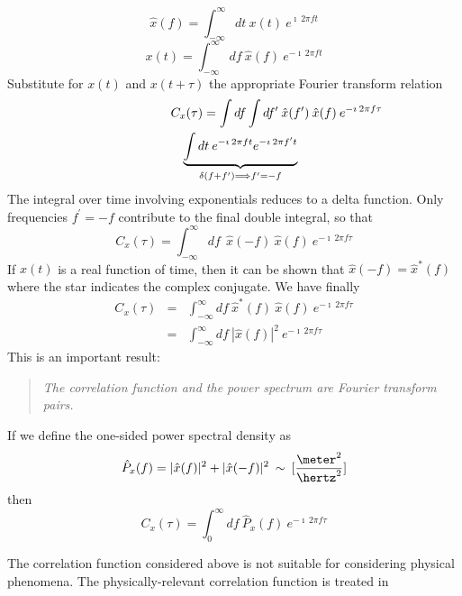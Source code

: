 \begin{equation}
\hat{x}(f) = \int_{-\infty}^{\infty} dt \: x(t) \: e^{\imath \: 2 \pi f t}
\end{equation}
\begin{equation}
x(t) = \int_{-\infty}^{\infty} df \: \hat{x}(f) \: e^{-\imath \: 2 \pi f t}
\end{equation}
Substitute for $x(t)$ and $x(t+\tau)$ the appropriate Fourier
transform relation
\begin{eqnarray*}
\lefteqn{C_x(\tau) = \int df  \int df^{\prime}  \: \hat{x}(f^{\prime}) \: \hat{x}(f) \: e^{-\imath \: 2 \pi f \tau}}\\
& & \underbrace{\int dt \: e^{-\imath \: 2 \pi f t}  e^{-\imath \: 2 \pi f^{\prime} t}}_{\delta(f+f^{\prime}) \Longrightarrow f^{\prime} = -f} 
\end{eqnarray*}
The integral over time involving exponentials reduces to a delta
function.  Only frequencies $f^{\prime} = -f$ contribute to the final
double integral, so that
\[
C_x(\tau) = \int_{-\infty}^{\infty} df \: \: \hat{x}(-f) \: \hat{x}(f) \: e^{-\imath \: 2 \pi f \tau}
\]
If $x(t)$ is a real function of time, then it can be shown that
$\hat{x}(-f) = \hat{x}^{*}(f)$ where the star indicates the complex
conjugate.  We have finally
\begin{eqnarray}
C_x(\tau) & = & \int_{-\infty}^{\infty} df \: \hat{x}^{*}(f) \: \hat{x}(f) \: e^{-\imath \: 2 \pi f \tau} \\ 
          & = & \int_{-\infty}^{\infty} df \: | \hat{x}(f) |^2 \: e^{-\imath \: 2 \pi f \tau} 
\end{eqnarray}
This is an important result: 
\begin{quote}
  \emph{The correlation function and the power spectrum are Fourier
  transform pairs.}
\end{quote}

If we define the one-sided power spectral density as
\begin{equation}
\hat{P}_x(f) = | \hat{x}(f) |^2 + | \hat{x}(-f) |^2  \: \sim \: [\frac{\meter^2}{\hertz^2}]
\end{equation}
then
\begin{equation}
C_x(\tau) = \int_{0}^{\infty} df \: \hat{P}_x(f) \: e^{-\imath \: 2 \pi f \tau}
\end{equation}


\label{sect:correlation-functions-II}

The correlation function considered above is not suitable for
considering physical phenomena.  The physically-relevant correlation
function is treated in

